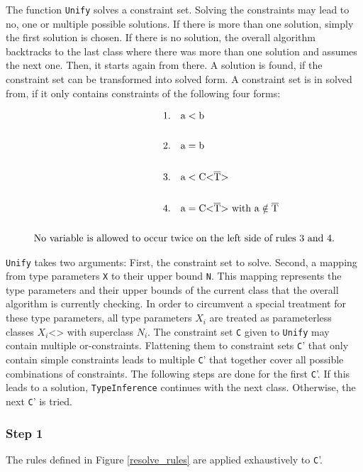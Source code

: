 The function \verb|Unify| solves a constraint set. Solving the constraints may lead to no, one or multiple possible solutions. If there is more than one solution, simply the first solution is chosen. If there is no solution, the overall algorithm backtracks to the last class where there was more than one solution and assumes the next one. Then, it starts again from there.
A solution is found, if the constraint set can be transformed into solved form. A constraint set is in solved from, if it only contains constraints of the following four forms:

\begin{align*}
    1.& \quad \text{a} < \text{b}\\
    \\
    2.& \quad \text{a} = \text{b}\\
    \\
    3.& \quad \text{a} < \text{C<} \ot{T} \text{>}\\
    \\
    4.& \quad \text{a} = \text{C<} \ot{T} \text{>} \ \text{with a} \notin \ot{T}\\
    \\
    \text{No variable is allowed to occur } & \text{twice on the left side of rules 3 and 4.}
\end{align*}

\verb|Unify| takes two arguments: First, the constraint set to solve. Second, a mapping from type parameters \verb|X| to their upper bound \verb|N|. This mapping represents the type parameters and their upper bounds of the current class that the overall algorithm is currently checking.
In order to circumvent a special treatment for these type parameters, all type parameters $X_i$ are treated as parameterless classes $X_i$<> with superclass $N_i$.
The constraint set \verb|C| given to \verb|Unify| may contain multiple or-constraints. Flattening them to constraint sets \verb|C|' that only contain simple constraints leads to multiple \verb|C|' that together cover all possible combinations of constraints.
The following steps are done for the first \verb|C|'. If this leads to a solution, \verb|TypeInference| continues with the next class. Otherwise, the next \verb|C|' is tried.

\subsubsection{Step 1}
The rules defined in Figure \ref{resolve_rules} are applied exhaustively to \verb|C|'.

